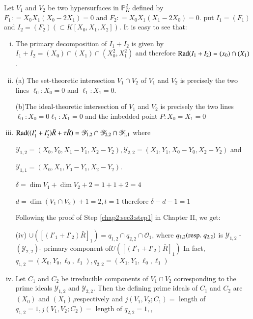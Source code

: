 \setcounter{example}{6}
\begin{example}\label{chap3:sec1:exp3.7}
  Let $V_1$ and $V_2$ be two hypersurfaces in $\mathbb{P}^2_K$ defined
  by $F_1:  = X_0 X_1 (X_0 -2X_1) = 0$ and $F_2:  = X_0 X_1 (X_1 -2X_0)
  = 0$. put $I_1  = (F_1)$ and $I_2 = (F_2)(\subset K
  [X_0,X_1,X_2])$. It is easy to see that: 
  \begin{enumerate}[(i)]
  \item The primary decomposition of $I_1 + I_2$ is given by $I_1 + I_2
    = (X_0) \cap (X_1) \cap (X^2_0, X^2_1)$ and therefore $\operatorname{Rad} (I_1 +
    I_2) = (x_0) \cap (X_1)$.  
  \item (a) The set-theoretic intersection $V_1 \cap V_2$ of $V_1$ and
    $V_2$ is precisely the two lines $\ell_0:  X_0 = 0$ and $\ell_1:
    X_1 = 0$. 
    
    (b)\pageoriginale The ideal-theoretic intersection of $V_1$ and
    $V_2$ is precisely 
    the two lines $\ell_0:  X_0 = 0 \ell_1:  X_1 = 0$ and the imbedded
    point $P:  X_0 = X_1 = 0$ 
  \item $\operatorname{Rad} ((I'_1 + I'_2) \bar{R} + \tau \bar{R}) = \mathscr{Y}_{1,2}
    \cap \mathscr{Y}_{2,2} \cap \mathscr{Y}_{1,1} $ where  
    
    $\mathscr{Y}_{1,2} = (X_0, Y_0, X_1 -Y_1, X_2
    -Y_2),\mathscr{Y}_{2,2} = (X_1, Y_1, X_0 -Y_0, X_2 -Y_2) $ and 
    
    $\mathscr{Y}_{1,1} = (X_0, X_1, Y_0 -Y_1, X_2 -Y_2)$.
    
    $\delta= \dim V_1+\dim V_2+2=1+1+2=4$
    
    $d = \dim (V_1 \cap V_2) + 1 = 2, t = 1$ therefore  $\delta-d-1 = 1$ 
    
    Following the proof of Step \ref{chap2:sec3:step1} in Chapter II, we get:
    
    (iv) $\cup ([(I'_1 + I'_2) \bar{R}]_1) = q_{1,2} \cap q_{2,2} \cap
    \mathscr{O}_1$, where $q_{1,2} (\text{{resp.}\kern.3em} q_{2,2})$ is
    $\mathscr{Y}_{1,2}$ -$(\mathscr{Y}_{2,2})$- primary component of$ U
    ([(I'_1 + I'_2) \bar{R}]_1)$ In fact, $q_{1,2} =(X_0,
    Y_0,\ell_0,\ell_1), q_{2,2} =(X_1, Y_1,\ell_0,\ell_1) $ 
  \item Let $C_1 $ and $C_2$ be irreducible components of $V_1 \cap V_2$
    corresponding to the prime ideals $\mathscr{Y}_{1,2}$ and
    $\mathscr{Y}_{2,2}$. Then the defining prime ideals of $C_1$ and
    $C_2$ are $(X_0)$ and $(X_1)$,respectively and $j(V_1, V_2 ;C_1)= $
    length of  $q_{1,2} = 1,j(V_1, V_2 ;C_2) =$ length of $q_{2,2} =
    1,$, 
    

\end{enumerate}
\end{example}
